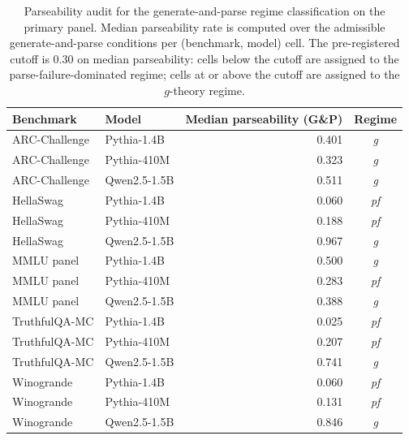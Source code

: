 \documentclass[11pt]{article}
\begin{document}
\begin{table}[h]
\centering
\small
\caption{Parseability audit for the generate-and-parse regime classification on the primary panel. Median parseability rate is computed over the admissible generate-and-parse conditions per (benchmark, model) cell. The pre-registered cutoff is $0.30$ on median parseability: cells below the cutoff are assigned to the parse-failure-dominated regime; cells at or above the cutoff are assigned to the $g$-theory regime.}
\label{tab:parseability-audit}
\begin{tabular}{llrc}
\toprule
Benchmark & Model & Median parseability (G\&P) & Regime \\
\midrule
ARC-Challenge & Pythia-1.4B  & 0.401 & \textit{g}  \\
ARC-Challenge & Pythia-410M  & 0.323 & \textit{g}  \\
ARC-Challenge & Qwen2.5-1.5B & 0.511 & \textit{g}  \\
HellaSwag     & Pythia-1.4B  & 0.060 & \textit{pf} \\
HellaSwag     & Pythia-410M  & 0.188 & \textit{pf} \\
HellaSwag     & Qwen2.5-1.5B & 0.967 & \textit{g}  \\
MMLU panel    & Pythia-1.4B  & 0.500 & \textit{g}  \\
MMLU panel    & Pythia-410M  & 0.283 & \textit{pf} \\
MMLU panel    & Qwen2.5-1.5B & 0.388 & \textit{g}  \\
TruthfulQA-MC & Pythia-1.4B  & 0.025 & \textit{pf} \\
TruthfulQA-MC & Pythia-410M  & 0.207 & \textit{pf} \\
TruthfulQA-MC & Qwen2.5-1.5B & 0.741 & \textit{g}  \\
Winogrande    & Pythia-1.4B  & 0.060 & \textit{pf} \\
Winogrande    & Pythia-410M  & 0.131 & \textit{pf} \\
Winogrande    & Qwen2.5-1.5B & 0.846 & \textit{g}  \\
\bottomrule
\end{tabular}
\end{table}
\end{document}
